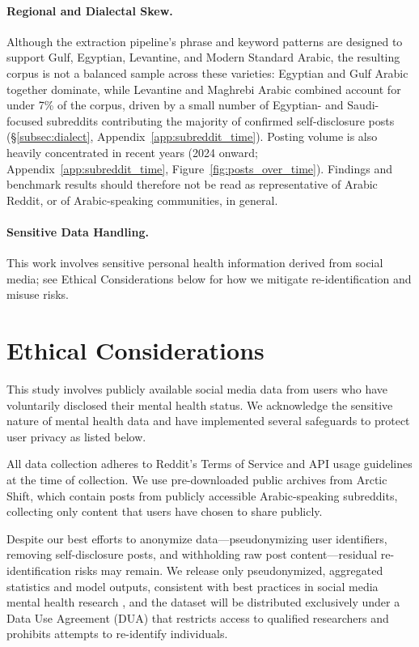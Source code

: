 \documentclass[11pt]{article}
\begin{document}
\paragraph{Regional and Dialectal Skew.}
Although the extraction pipeline's phrase and keyword patterns are designed to support Gulf, Egyptian, Levantine, and Modern Standard Arabic, the resulting corpus is not a balanced sample across these varieties: Egyptian and Gulf Arabic together dominate, while Levantine and Maghrebi Arabic combined account for under 7\% of the corpus, driven by a small number of Egyptian- and Saudi-focused subreddits contributing the majority of confirmed self-disclosure posts (§\ref{subsec:dialect}, Appendix~\ref{app:subreddit_time}). Posting volume is also heavily concentrated in recent years (2024 onward; Appendix~\ref{app:subreddit_time}, Figure~\ref{fig:posts_over_time}). Findings and benchmark results should therefore not be read as representative of Arabic Reddit, or of Arabic-speaking communities, in general.

\paragraph{Sensitive Data Handling.}
\label{par:sensitive_data}
This work involves sensitive personal health information derived from social media; see Ethical Considerations below for how we mitigate re-identification and misuse risks.


\section*{Ethical Considerations}
\label{sec:ethics}
This study involves publicly available social media data from users who have voluntarily disclosed their mental health status. We acknowledge the sensitive nature of mental health data and have implemented several safeguards to protect user privacy as listed below.

All data collection adheres to Reddit's Terms of Service and API usage guidelines at the time of collection. We use pre-downloaded public archives from Arctic Shift, which contain posts from publicly accessible Arabic-speaking subreddits, collecting only content that users have chosen to share publicly.

Despite our best efforts to anonymize data---pseudonymizing user identifiers, removing self-disclosure posts, and withholding raw post content---residual re-identification risks may remain. We release only pseudonymized, aggregated statistics and model outputs, consistent with best practices in social media mental health research \cite{harrigian2021state}, and the dataset will be distributed exclusively under a Data Use Agreement (DUA) that restricts access to qualified researchers and prohibits attempts to re-identify individuals.
\end{document}
